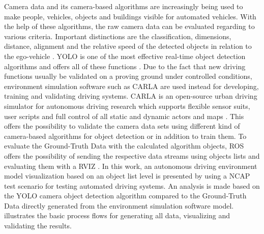 Camera data and its camera-based algorithms are increasingly being used to make people, vehicles, objects and buildings visible for automated vehicles. With the help of these algorithms, the raw camera data can be evaluated regarding to various criteria. Important distinctions are the classification, dimensions, distance, alignment and the relative speed of the detected objects in relation to the ego-vehicle \cite{Aeberhard}. \ac{YOLO} is one of the most effective real-time object detection algorithms and offers all of these functions \cite{knuthwebsite}.
Due to the fact that new driving functions usually be validated on a proving ground under controlled conditions, environment simulation software such as CARLA are used instead for developing, training and validating driving systems\cite{Gap}. CARLA is an open-source urban driving simulator for autonomous driving research which supports flexible sensor suits, user scripts and full control of all static and dynamic actors and maps \cite{Dosovitskiy17}. This offers the possibility to validate the camera data sets using different kind of camera-based algorithms for object detection or in addition to train them. To evaluate the Ground-Truth Data with the calculated algorithm objects, \ac{ROS} offers the possibility of sending the respective data streams using objects lists and evaluating them with a \ac{RVIZ} \cite{ROS}.
In this work, an autonomous driving environment model visualization based on an object list level is presented by using a NCAP test scenario for testing automated driving systems. An analysis is made based on the \ac{YOLO} camera object detection algorithm compared to the Ground-Truth Data directly generated from the environment simulation software model.  illustrates the basic process flows for generating all data, visualizing and validating the results.


